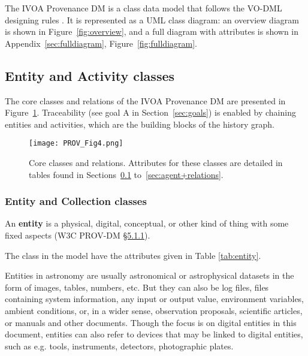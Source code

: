 The IVOA Provenance DM is a class data model that follows the VO-DML designing rules \citep{2018ivoa.spec.0910L}. It is represented as a UML class diagram: an overview diagram is shown in Figure~\ref{fig:overview}, and a full diagram with attributes is shown in Appendix~\ref{sec:fulldiagram}, Figure~\ref{fig:fulldiagram}.


\subsection{Entity and Activity classes}
\label{sec:ent_act}

The core classes and relations of the IVOA Provenance DM are presented in Figure~\ref{fig:coreclasses}.
Traceability (see goal A in Section~\ref{sec:goals}) is enabled by chaining entities and activities, which are the building blocks of the history graph.


\begin{figure}[ht]
\centering
\texttt{[image: PROV\_Fig4.png]}
\caption[Core classes and relations]{Core classes and relations. Attributes for these classes are detailed in tables found in Sections~\ref{sec:ent_act} to~\ref{sec:agent+relations}.}
\label{fig:coreclasses}
\end{figure}



\subsubsection{Entity and Collection classes}
\label{sec:Entity}

An \textbf{entity} is a physical, digital, conceptual, or other kind of thing with some fixed aspects (W3C PROV-DM \href{https://www.w3.org/TR/prov-dm/#term-entity}{\S5.1.1}). 

The  class in the model have the attributes given in Table \ref{tab:entity}. 


Entities in astronomy are usually astronomical or astrophysical datasets in the form of images, tables, numbers, etc. But they can also be log files, files containing system information, any input or output value, environment variables, ambient conditions, or, in a wider sense, observation proposals, scientific articles, or manuals and other documents. 
Though the focus is on digital entities in this document, entities can also refer to devices that may be linked to digital entities, such as e.g. tools, instruments, detectors, photographic plates.


